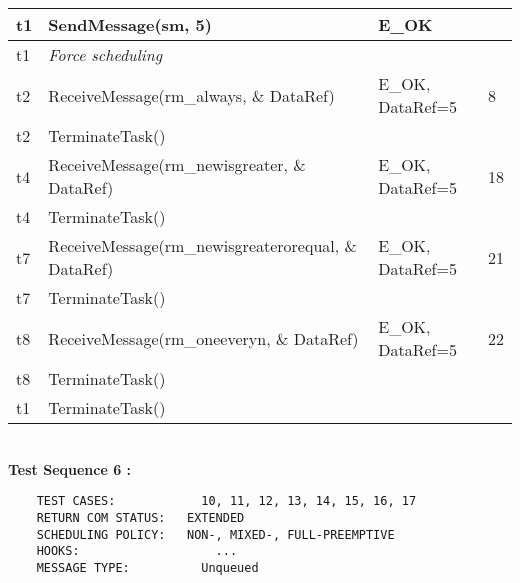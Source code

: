 \documentclass[10pt]{article}
\newlength{\Li}\settowidth{\Li}{Running}
\newlength{\Lii}\setlength{\Lii}{7cm}
\newlength{\Liiii}\setlength{\Liiii}{0.9cm}
\newlength{\Liii}\setlength{\Liii}{\textwidth} \addtolength{\Liii}{-\Li} \addtolength{\Liii}{-\Lii} \addtolength{\Liii}{-\Liiii}
\begin{document}
\begin{supertabular}{|p{\Li}|p{\Lii}|p{\Liii}|p{\Liiii}|}
	t1	& SendMessage(sm, 5)										& E\_OK				& \\ \hline
	t1	& \textit{Force scheduling}									& 					& \\ \hline
	t2	& ReceiveMessage(rm\_always, \& DataRef)						& E\_OK, DataRef=5		& 8 \\ \hline
	t2	& TerminateTask()											& 					&\\ \hline	
	t4	& ReceiveMessage(rm\_newisgreater, \& DataRef)					& E\_OK, DataRef=5		&18 \\ \hline
	t4	& TerminateTask()											& 					&\\ \hline
	t7	& ReceiveMessage(rm\_newisgreaterorequal, \& DataRef)			& E\_OK, DataRef=5		& 21 \\ \hline
	t7	& TerminateTask()											& 					&\\ \hline	
	t8	& ReceiveMessage(rm\_oneeveryn, \& DataRef)					& E\_OK, DataRef=5		& 22 \\ \hline
	t8	& TerminateTask()											& 					&\\ \hline
	t1	& TerminateTask()											& 					&\\ \hline
	
	\end{supertabular}\\
	
	\textbf{Test Sequence 6 :}
	\begin{lstlisting}
	TEST CASES:		       10, 11, 12, 13, 14, 15, 16, 17
	RETURN COM STATUS:	 EXTENDED
	SCHEDULING POLICY:   NON-, MIXED-, FULL-PREEMPTIVE
	HOOKS:			         ...
	MESSAGE TYPE:	       Unqueued
	\end{lstlisting}
	
	
\end{document}
